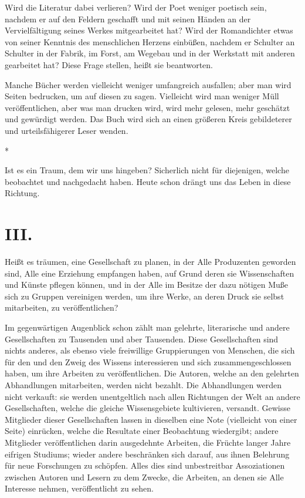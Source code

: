 \documentclass{scrbook}
\begin{document}
Wird die Literatur dabei verlieren? Wird der Poet weniger poetisch sein, nachdem er auf den Feldern geschafft und mit seinen Händen an der Vervielfältigung seines Werkes mitgearbeitet hat? Wird der Romandichter etwas von seiner Kenntnis des menschlichen Herzens einbüßen, nachdem er Schulter an Schulter in der Fabrik, im Forst, am Wegebau und in der Werkstatt mit anderen gearbeitet hat? Diese Frage stellen, heißt sie beantworten.

Manche Bücher werden vielleicht weniger umfangreich ausfallen; aber man wird  Seiten bedrucken, um auf diesen  zu sagen. Vielleicht wird man weniger Müll veröffentlichen, aber was man drucken wird, wird mehr gelesen, mehr geschätzt und gewürdigt werden. Das Buch wird sich an einen größeren Kreis gebildeterer und urteilsfähigerer Leser wenden.

\begin{center}*\end{center}

Ist es ein Traum, dem wir uns hingeben? Sicherlich nicht für diejenigen, welche beobachtet und nachgedacht haben. Heute schon drängt uns das Leben in diese Richtung.

\section*{III.}

Heißt es träumen, eine Gesellschaft zu planen, in der Alle Produzenten geworden sind, Alle eine Erziehung empfangen haben, auf Grund deren sie Wissenschaften und Künste pflegen können, und in der Alle im Besitze der dazu nötigen Muße sich zu Gruppen vereinigen werden, um ihre Werke, an deren Druck sie selbst mitarbeiten, zu veröffentlichen?

Im gegenwärtigen Augenblick schon zählt man gelehrte, literarische und andere Gesellschaften zu Tausenden und aber Tausenden. Diese Gesellschaften sind nichts anderes, als ebenso viele freiwillige Gruppierungen von Menschen, die sich für den und den Zweig des Wissens interessieren und sich zusammengeschlossen haben, um ihre Arbeiten zu veröffentlichen. Die Autoren, welche an den gelehrten Abhandlungen mitarbeiten, werden nicht bezahlt. Die Abhandlungen werden nicht verkauft: sie werden unentgeltlich nach allen Richtungen der Welt an andere Gesellschaften, welche die gleiche Wissensgebiete kultivieren, versandt. Gewisse Mitglieder dieser Gesellschaften lassen in dieselben eine Note (vielleicht von einer Seite) einrücken, welche die Resultate einer Beobachtung wiedergibt; andere Mitglieder veröffentlichen darin ausgedehnte Arbeiten, die Früchte langer Jahre eifrigen Studiums; wieder andere beschränken sich darauf, aus ihnen Belehrung für neue Forschungen zu schöpfen. Alles dies sind unbestreitbar Assoziationen zwischen Autoren und Lesern zu dem Zwecke, die Arbeiten, an denen sie Alle Interesse nehmen, veröffentlicht zu sehen.
\end{document}
